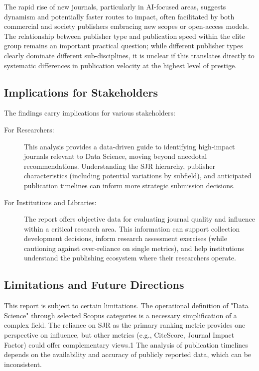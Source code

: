 \documentclass[../main.tex]{subfiles}
\begin{document}
\vspace{0.4cm}
\noindent
The rapid rise of new journals, particularly in AI-focused areas, suggests dynamism and potentially faster routes to impact, often facilitated by both commercial and society publishers embracing new scopes or open-access models. The relationship between publisher type and publication speed within the elite group remains an important practical question; while different publisher types clearly dominate different sub-disciplines, it is unclear if this translates directly to systematic differences in publication velocity at the highest level of prestige.

\subsection{Implications for Stakeholders}

\vspace{0.4cm}
\noindent
The findings carry implications for various stakeholders:

\begin{description}
    \item[For Researchers:] This analysis provides a data-driven guide to identifying high-impact journals relevant to Data Science, moving beyond anecdotal recommendations. Understanding the SJR hierarchy, publisher characteristics (including potential variations by subfield), and anticipated publication timelines can inform more strategic submission decisions.
    
    \item[For Institutions and Libraries:] The report offers objective data for evaluating journal quality and influence within a critical research area. This information can support collection development decisions, inform research assessment exercises (while cautioning against over-reliance on single metrics), and help institutions understand the publishing ecosystem where their researchers operate.
\end{description}

\subsection{Limitations and Future Directions}

\vspace{0.4cm}
\noindent
This report is subject to certain limitations. The operational definition of "Data Science" through selected Scopus categories is a necessary simplification of a complex field. The reliance on SJR as the primary ranking metric provides one perspective on influence, but other metrics (e.g., CiteScore, Journal Impact Factor) could offer complementary views.1 The analysis of publication timelines depends on the availability and accuracy of publicly reported data, which can be inconsistent.
\end{document}
